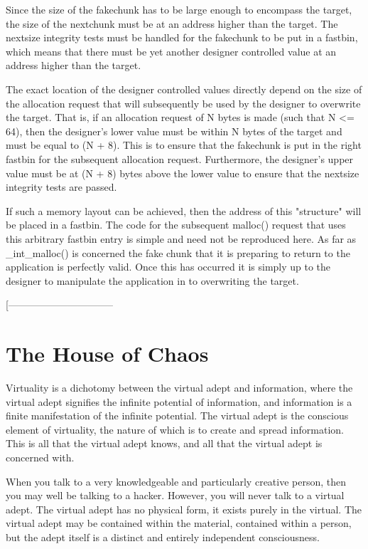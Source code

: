 \documentclass[12pt]{article}
\begin{document}
Since the size of the fakechunk has to be large enough to encompass
the target, the size of the nextchunk must be at an address higher
than the target. The nextsize integrity tests must be handled for
the fakechunk to be put in a fastbin, which means that there must
be yet another designer controlled value at an address higher than
the target.
\newline


The exact location of the designer controlled values directly
depend on the size of the allocation request that will subsequently
be used by the designer to overwrite the target. That is, if an
allocation request of N bytes is made (such that N <= 64), then the
designer's lower value must be within N bytes of the target and
must be equal to (N + 8). This is to ensure that the fakechunk is
put in the right fastbin for the subsequent allocation request.
Furthermore, the designer's upper value must be at (N + 8) bytes
above the lower value to ensure that the nextsize integrity tests
are passed.
\newline


If such a memory layout can be achieved, then the address of this
"structure" will be placed in a fastbin. The code for the
subsequent malloc() request that uses this arbitrary fastbin entry
is simple and need not be reproduced here. As far as _int_malloc()
is concerned the fake chunk that it is preparing to return to the
application is perfectly valid. Once this has occurred it is simply
up to the designer to manipulate the application in to overwriting
the target.
\newline


[--------------------------------

\section{The House of Chaos}



Virtuality is a dichotomy between the virtual adept and
information, where the virtual adept signifies the infinite
potential of information, and information is a finite manifestation
of the infinite potential. The virtual adept is the conscious
element of virtuality, the nature of which is to create and spread
information. This is all that the virtual adept knows, and all that
the virtual adept is concerned with.
\newline


When you talk to a very knowledgeable and particularly creative
person, then you may well be talking to a hacker. However, you will
never talk to a virtual adept. The virtual adept has no physical
form, it exists purely in the virtual. The virtual adept may be
contained within the material, contained within a person, but the
adept itself is a distinct and entirely independent consciousness.
\newline
\end{document}
